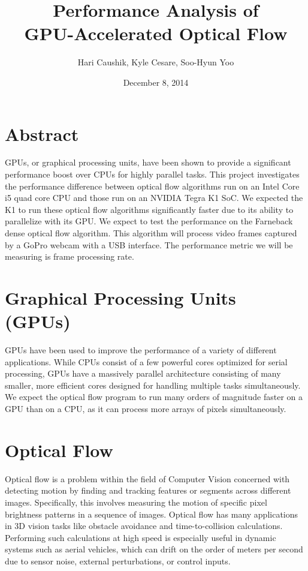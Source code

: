 \documentclass[12pt,letterpaper]{article}
\title{Performance Analysis of \\ GPU-Accelerated Optical Flow}
\date{December 8, 2014}
\author{Hari Caushik, Kyle Cesare, Soo-Hyun Yoo}
\begin{document}
\maketitle
\thispagestyle{empty}
\newpage

\tableofcontents
\newpage

\section{Abstract}
GPUs, or graphical processing units, have been shown to provide a significant
performance boost over CPUs for highly parallel tasks. This project
investigates the performance difference between optical flow algorithms run on
an Intel Core i5 quad core CPU and those run on an NVIDIA Tegra K1 SoC. We
expected the K1 to run these optical flow algorithms significantly faster due
to its ability to parallelize with its GPU. We expect to test the performance
on the Farneback dense optical flow algorithm. This algorithm will process
video frames captured by a GoPro webcam with a USB interface. The performance
metric we will be measuring is frame processing rate.

\section{Graphical Processing Units (GPUs)}
GPUs have been used to improve the performance of a variety of different
applications. While CPUs consist of a few powerful cores optimized for serial
processing, GPUs have a massively parallel architecture consisting of many
smaller, more efficient cores designed for handling multiple tasks
simultaneously. We expect the optical flow program to run many orders of
magnitude faster on a GPU than on a CPU, as it can process more arrays of
pixels simultaneously.

\section{Optical Flow}
Optical flow is a problem within the field of Computer Vision concerned with
detecting motion by finding and tracking features or segments across different
images. Specifically, this involves measuring the motion of specific pixel
brightness patterns in a sequence of images. Optical flow has many applications
in 3D vision tasks like obstacle avoidance and time-to-collision calculations.
Performing such calculations at high speed is especially useful in dynamic
systems such as aerial vehicles, which can drift on the order of meters per
second due to sensor noise, external perturbations, or control inputs.
\end{document}
